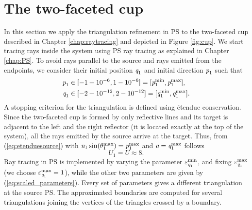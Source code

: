 \section{The two-faceted cup}
In this section we apply the triangulation refinement in PS to the two-faceted cup described in Chapter \ref{chap:raytracing} and depicted in Figure \ref{fig:cup}. 
We start tracing rays inside the system using PS ray tracing as explained in Chapter \ref{chap:PS}. To avoid rays parallel to the source and rays emitted from the endpoints, we consider their initial position $\textit{q}_1$ and initial direction $\textit{p}_1$ such that 
\begin{equation*}
\begin{aligned}
\textit{p}_1&\in[-1+10^{-6},1-10^{-6}] = [\textit{p}_1^{\textrm{min}}, \textit{p}_1^{\textrm{max}}], \\ 
\textit{q}_1&\in[-2+10^{-12}, 2-10^{-12}] = [\textit{q}_1^{\textrm{min}}, \textit{q}_1^{\textrm{max}}].
\end{aligned}
\end{equation*} 
A stopping criterion for the triangulation is defined using \'{e}tendue conservation. Since the two-faceted cup is formed by only reflective lines and its target is adjacent to the left and the right reflector (it is located exactly at the top of the system),  all the rays emitted by the source arrive at the target. Thus, from (\ref{eq:etenduesource}) with $\textit{n}_1\sin(\theta_1^{\textrm{max}})=\textit{p}_1^\textrm{max}$ and $\textit{a}=\textit{q}_1^{\textrm{max}}$ follows
\begin{equation}U_1 = U \approx 8. \end{equation}
Ray tracing in PS is implemented by varying the parameter $\varepsilon_{\textit{q}_1}^{\textrm{min}}$, and fixing  $\varepsilon_{\textit{q}_1}^{\textrm{max}}$ (we choose $\varepsilon_{\textit{q}_1}^{\textrm{max}}=1$), while the other two parameters are given by (\ref{eq:scaled_parameters}).
Every set of parameters gives a different triangulation at the source PS. The approximated boundaries are computed for several triangulations joining the vertices of the triangles crossed by a boundary. 
